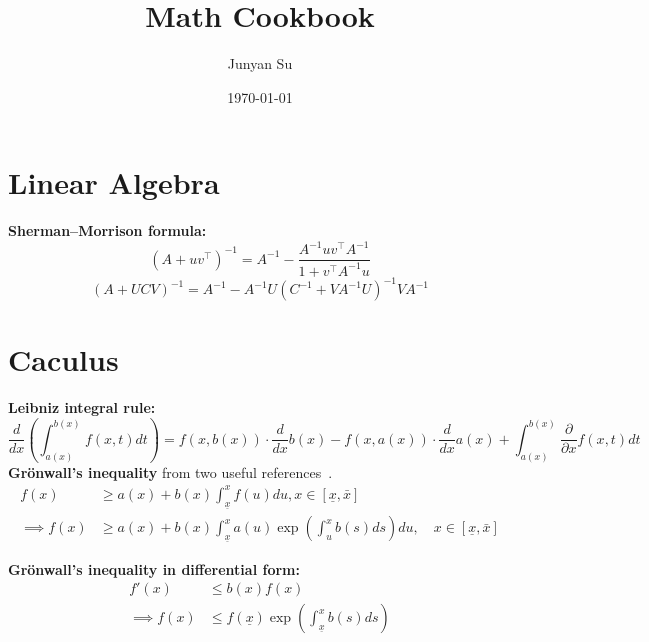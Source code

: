 \documentclass{article}
\title{Math Cookbook}
\author{Junyan Su}
\date{\today}
\begin{document}
\maketitle

\section{Linear Algebra}
\textbf{Sherman–Morrison formula:} 
\begin{equation}
\left(A+u v^{\top}\right)^{-1}=A^{-1}-\frac{A^{-1} u v^{\top} A^{-1}}{1+v^{\top} A^{-1} u}
\end{equation}
\begin{equation}
(A+U C V)^{-1}=A^{-1}-A^{-1} U\left(C^{-1}+V A^{-1} U\right)^{-1} V A^{-1}
\end{equation}

\section{Caculus}
\noindent\textbf{Leibniz integral rule:}
\begin{equation}
\frac{d}{d x}\left(\int_{a(x)}^{b(x)} f(x, t) d t\right)=f(x, b(x)) \cdot \frac{d}{d x} b(x)-f(x, a(x)) \cdot \frac{d}{d x} a(x)+\int_{a(x)}^{b(x)} \frac{\partial}{\partial x} f(x, t) d t
\end{equation}
\textbf{Grönwall's inequality} from two useful references~\cite{jonesFundamental1964,mitrinovicInequalities2012}. 
\begin{align}
	f(x) &\geq a(x)+b(x) \int_{\underline{x}}^{x} f(u) d u, x \in[\underline{x}, \bar{x}] \\
	\implies f(x) &\geq a(x)+b(x) \int_{\underline{x}}^{x} a(u) \exp \left(\int_{u}^{x} b(s) d s\right) d u, \quad x \in[\underline{x}, \bar{x}]
\end{align}

\noindent\textbf{Grönwall's inequality in differential form:}
\begin{align}
	f'(x) &\leq b(x) f(x) \\
	\implies f(x) &\leq f(\underline{x}) \exp\left( \int_{\underline{x}}^{x} b(s) ds \right)
\end{align}




\end{document}

